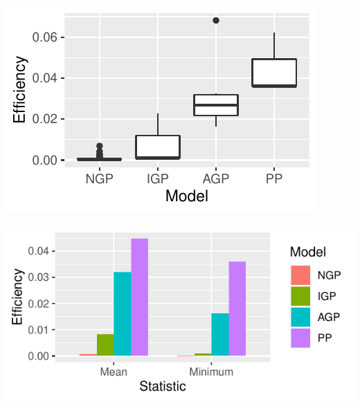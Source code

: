 \documentclass{article}
\begin{document}
\includegraphics{boxplots}

\includegraphics{barplots}
\end{document}
